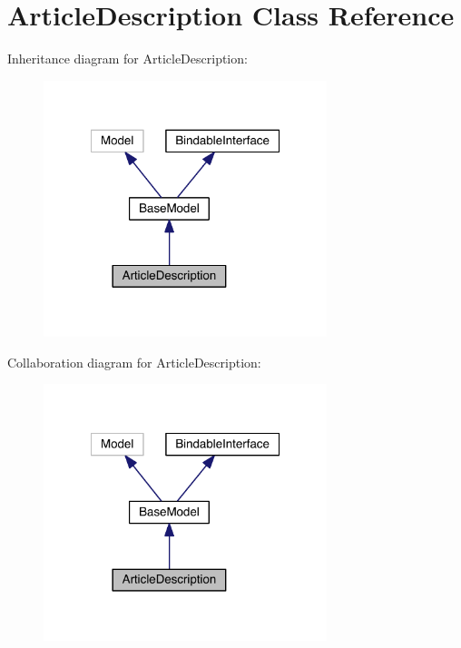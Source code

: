 \hypertarget{class_entity_1_1_article_description}{\section{Article\-Description Class Reference}
\label{class_entity_1_1_article_description}
}


Inheritance diagram for Article\-Description\-:
\nopagebreak
\begin{figure}[H]
\begin{center}
\leavevmode
\includegraphics[width=234pt]{class_entity_1_1_article_description__inherit__graph}
\end{center}
\end{figure}


Collaboration diagram for Article\-Description\-:
\nopagebreak
\begin{figure}[H]
\begin{center}
\leavevmode
\includegraphics[width=234pt]{class_entity_1_1_article_description__coll__graph}
\end{center}
\end{figure}
